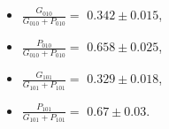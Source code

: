 \begin{itemize}
  \item $\frac{G_{010}}{G_{010} + P_{010}} =$ $0.342 \pm 0.015$,
  \item $\frac{P_{010}}{G_{010} + P_{010}} =$ $0.658 \pm 0.025$,
  \item $\frac{G_{101}}{G_{101} + P_{101}} =$ $0.329 \pm 0.018$,
  \item $\frac{P_{101}}{G_{101} + P_{101}} =$ $0.67 \pm 0.03$.
\end{itemize}
